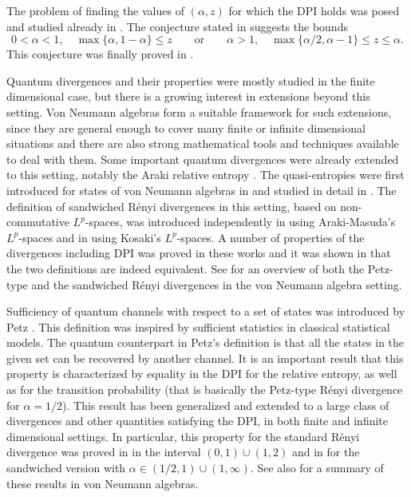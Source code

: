 \documentclass[12pt]{article}
\theoremstyle{definition}
\theoremstyle{remark}
\numberwithin{equation}{section}
\begin{document}
The problem of finding the values of $(\alpha,z)$ for which the DPI holds was posed and studied
already in \cite{audenaert2015alpha}. The conjecture stated in
\cite{carlen2018inequalities} suggests the bounds
\[
0<\alpha<1, \quad \max\{\alpha,1-\alpha\}\le z\qquad \text{or}\qquad \alpha>1,\quad
\max\{{\alpha/2},\alpha-1\}\le z\le \alpha.
\]
This conjecture was finally proved in \cite{zhang2020fromwyd}.


Quantum divergences and their properties were mostly studied in the finite dimensional
case, but there is a growing interest in extensions beyond this setting. Von Neumann
algebras form a suitable framework for such extensions, since {they} are general enough to
cover many finite or infinite dimensional situations and there are also strong mathematical
tools and techniques available to deal with them. Some important quantum divergences were
already extended to this setting, notably the Araki relative entropy \cite{araki1976relative}. The
quasi-entropies were first introduced for states of von Neumann algebras {in}
\cite{petz1985quasi} and studied in detail in \cite{hiai2018quantum}. The definition of sandwiched
R\'enyi divergences in this setting, based on non-commutative $L^p$-spaces,  was
introduced independently in \cite{berta2018renyi}  using {Araki-Masuda's} $L^p$-spaces and
in \cite{jencova2018renyi,jencova2021renyi} using {Kosaki's} $L^p$-spaces. A number of
properties of the divergences including DPI was proved in these works and it was shown in
\cite{jencova2018renyi} that the two definitions are indeed equivalent. See \cite{hiai2021quantum} for
an overview of both the Petz-type and {the} sandwiched R\'enyi divergences in the
von Neumann algebra setting.

Sufficiency {of} quantum channels with respect to a set of states was introduced by Petz
\cite{petz1986sufficient,petz1988sufficiency}. This definition was inspired by sufficient statistics 
{in} classical statistical models. The quantum counterpart in Petz's definition is that all
the states in the given set can be recovered by another channel. It is an important result
that this property is characterized by equality in the DPI for the relative entropy, as well
as for the transition probability (that is basically the Petz-type R\'enyi divergence for
$\alpha=1/2$). This result has been generalized and extended to a large class of
divergences and other quantities satisfying the DPI, in both finite and infinite
dimensional settings. In particular, this property 
for the standard R\'enyi divergence was proved in \cite{hiai2017different} in the interval $(0,1)\cup(1,2)$
and in \cite{jencova2017preservation, jencova2018renyi, jencova2021renyi} for the sandwiched version
with $\alpha\in(1/2,1)\cup(1,\infty)$. See also \cite{hiai2021quantum} for a summary of these {results}
{in} von Neumann algebras.  
\end{document}
